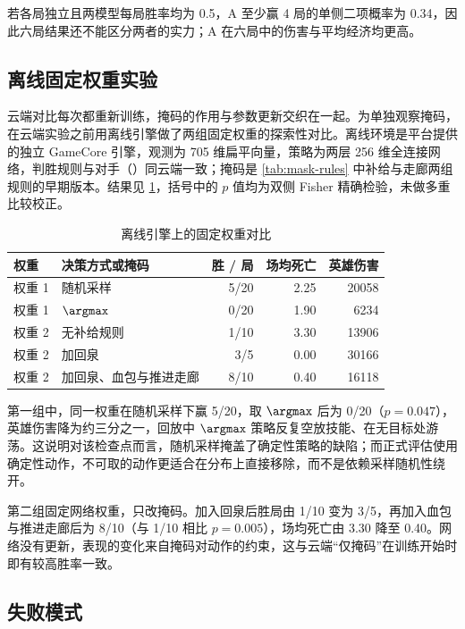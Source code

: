 若各局独立且两模型每局胜率均为 \num{0.5}，A 至少赢 \num{4} 局的单侧二项概率为 \num{0.34}，因此六局结果还不能区分两者的实力；A 在六局中的伤害与平均经济均更高。

\subsection{离线固定权重实验}
\label{sec:local}

云端对比每次都重新训练，掩码的作用与参数更新交织在一起。为单独观察掩码，在云端实验之前用离线引擎做了两组固定权重的探索性对比。离线环境是平台提供的独立 GameCore 引擎，观测为 \num{705} 维扁平向量，策略为两层 \num{256} 维全连接网络，判胜规则与对手（）同云端一致；掩码是 \cref{tab:mask-rules} 中补给与走廊两组规则的早期版本。结果见 \cref{tab:local}，括号中的 $p$ 值均为双侧 Fisher 精确检验，未做多重比较校正。

\begin{table}[htbp]
  \centering
  \caption{离线引擎上的固定权重对比}
  \label{tab:local}
  \begin{tabular}{llrrr}
    \toprule
    权重 & 决策方式或掩码 & 胜 / 局 & 场均死亡 & 英雄伤害 \\
    \midrule
    权重 1 & 随机采样 & 5/20 & 2.25 & 20058 \\
    权重 1 & $\argmax$ & 0/20 & 1.90 & 6234 \\
    \midrule
    权重 2 & 无补给规则 & 1/10 & 3.30 & 13906 \\
    权重 2 & 加回泉 & 3/5 & 0.00 & 30166 \\
    权重 2 & 加回泉、血包与推进走廊 & 8/10 & 0.40 & 16118 \\
    \bottomrule
  \end{tabular}
\end{table}

第一组中，同一权重在随机采样下赢 \num{5}/\num{20}，取 $\argmax$ 后为 \num{0}/\num{20}（$p=0.047$），英雄伤害降为约三分之一，回放中 $\argmax$ 策略反复空放技能、在无目标处游荡。这说明对该检查点而言，随机采样掩盖了确定性策略的缺陷；而正式评估使用确定性动作，不可取的动作更适合在分布上直接移除，而不是依赖采样随机性绕开。

第二组固定网络权重，只改掩码。加入回泉后胜局由 \num{1}/\num{10} 变为 \num{3}/\num{5}，再加入血包与推进走廊后为 \num{8}/\num{10}（与 \num{1}/\num{10} 相比 $p=0.005$），场均死亡由 \num{3.30} 降至 \num{0.40}。网络没有更新，表现的变化来自掩码对动作的约束，这与云端“仅掩码”在训练开始时即有较高胜率一致。

\subsection{失败模式}
\label{sec:failure}

